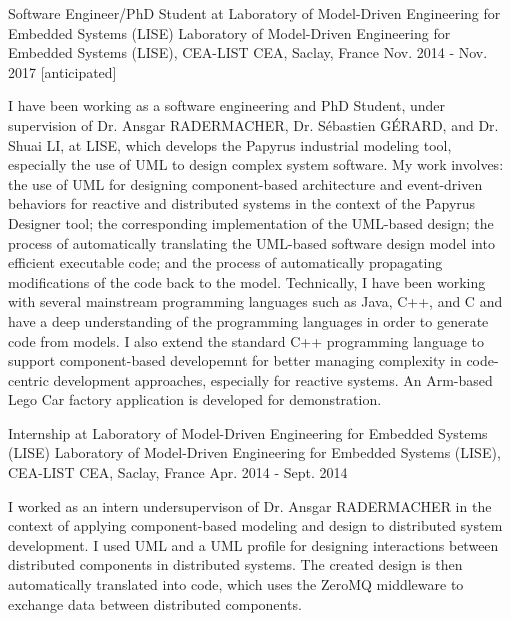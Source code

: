 
\begin{cventries}

\cventry
{Software Engineer/PhD Student at Laboratory of Model-Driven Engineering for Embedded Systems (LISE)} %
{Laboratory of Model-Driven Engineering for Embedded Systems (LISE), CEA-LIST} %
{CEA, Saclay, France} %
{Nov. 2014 - Nov. 2017 [anticipated]} %
{ %
	\begin{cvitems}
		\item {I have been working as a software engineering and PhD Student, under supervision of Dr. Ansgar RADERMACHER, Dr. S\'ebastien G\'ERARD, and Dr. Shuai LI, at LISE, which develops the Papyrus industrial modeling tool, especially the use of UML to design complex system software. My work involves: the use of UML for designing component-based architecture and event-driven behaviors for reactive and distributed systems in the context of the Papyrus Designer tool; the corresponding implementation of the UML-based design; the process of automatically translating the UML-based software design model into efficient executable code; and the process of automatically propagating modifications of the code back to the model. Technically, I have been working with several mainstream programming languages such as Java, C++, and C and have a deep understanding of the programming languages in order to generate code from models. I also extend the standard C++ programming language to support component-based developemnt for better managing complexity in code-centric development approaches, especially for reactive systems. An Arm-based Lego Car factory application is developed for demonstration.}		
	\end{cvitems}
}


\cventry
{Internship at Laboratory of Model-Driven Engineering for Embedded Systems (LISE)} %
{Laboratory of Model-Driven Engineering for Embedded Systems (LISE), CEA-LIST} %
{CEA, Saclay, France} %
{Apr. 2014 - Sept. 2014} %
{ %
	\begin{cvitems}
		\item {I worked as an intern undersupervison of Dr. Ansgar RADERMACHER in the context of applying component-based modeling and design to distributed system development. I used UML and a UML profile for designing interactions between distributed components in distributed systems. The created design is then automatically translated into code, which uses the ZeroMQ middleware to exchange data between distributed components.}		
	\end{cvitems}
}



\end{cventries}
